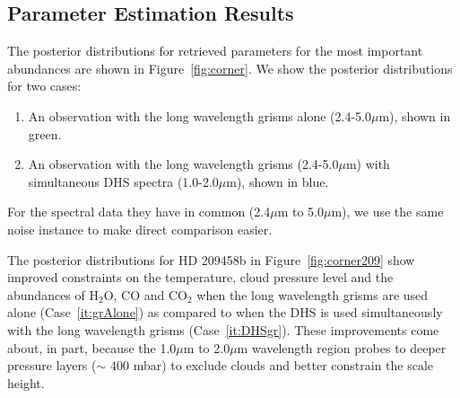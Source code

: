 \documentclass[iop]{emulateapj}
\begin{document}




\subsection{Parameter Estimation Results}\label{sec:retrievals}

The posterior distributions for retrieved parameters for the most important abundances are shown in Figure~\ref{fig:corner}.
We show the posterior distributions for two cases:
\begin{enumerate}
\item \label{it:grAlone} An observation with the long wavelength grisms alone (2.4-5.0$\mu$m), shown in green.
\item \label{it:DHSgr} An observation with the long wavelength grisms (2.4-5.0$\mu$m) with simultaneous DHS spectra (1.0-2.0$\mu$m), shown in blue.
\end{enumerate}
For the spectral data they have in common (2.4$\mu$m to 5.0$\mu$m), we use the same noise instance to make direct comparison easier.

The posterior distributions for HD 209458b in Figure~\ref{fig:corner209} show improved constraints on the temperature, cloud pressure level and the abundances of H$_2$O, CO and CO$_2$ when the long wavelength grisms are used alone (Case~\ref{it:grAlone}) as compared to when the DHS is used simultaneously with the long wavelength grisms (Case~\ref{it:DHSgr}).
These improvements come about, in part, because the 1.0$\mu$m to 2.0$\mu$m wavelength region probes to deeper pressure layers ($\sim$ 400 mbar) to exclude clouds and better constrain the scale height.

\end{document}
